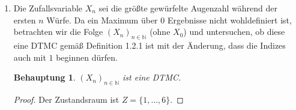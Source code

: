 \documentclass[a4paper]{scrartcl}
\newtheorem*{behaupt}{Behauptung}
\newcommand{\N}{\mathbb{N}}
\newcommand{\prob}{\mathbb{P}}
\begin{document}
\begin{enumerate}[label=\bfseries 1.\arabic*]
\begin{enumerate}[label=\alph*)]
\begin{proof}
                    Die Wahrscheinlichkeit, dass $X_n$ den Zustand $j \in \N_0$
                    annimmt, ist nur von dem Zustand $X_{n-1}$ abhängig ($n \in
                    \N$).  Dabei unterscheiden wir drei Fälle: Wird im $n$-ten
                    Wurf eine Sechs gewürfelt (Wahrscheinlichkeit
                    $\nicefrac{1}{6}$), wird die Anzahl ewürfelter Sechsen
                    inkrementiert ($X_n = X_{n-1}+1$). Bei allen anderen
                    Augenzahlen (Wahrscheinlichkeit $\nicefrac{5}{6}$) bleibt
                    die Anzahl gewürfelter Sechsen unverändert ($X_n =
                    X_{n-1}$).  Weiterhin kann die Anzahl gewürfelter Sechsen
                    nicht verringert oder um mehr als $1$ erhöht werden.
                    Derartige Übergänge sind also ausgeschlossen.
                    Für die Einschritt-Übergangswahrscheinlichkeiten gilt also
                    \begin{equation*}
                        p_{ij} = \prob(X_1=j \ |\  X_0=i) =
                        \begin{cases}
                            \nicefrac{1}{6} & \text{if } j = i + 1 \\
                            \nicefrac{5}{6} & \text{if } j = i \\
                            0 & \text{else}
                        \end{cases}
                        \qquad
                        \forall i,j \in N_0
                        \text{ .}
                    \end{equation*}
                    Da bei $0$ Würfen noch keine Sechs gefallen sein kann, gilt
                    $\prob(X_0 = 0) = 1$.
                    Damit ist $(X_n)_{n \in \N_0}$ eine Markov-Kette.
                \end{proof}

            \item
                Die Zufallsvariable $X_n$ sei die größte gewürfelte Augenzahl
                während der ersten $n$ Würfe.
                Da ein Maximum über $0$ Ergebnisse nicht wohldefiniert ist,
                betrachten wir die Folge $(X_n)_{n \in \N}$ (ohne $X_0$) und
                untersuchen, ob diese eine DTMC gemäß Definition 1.2.1 ist mit
                der Änderung, dass die Indizes auch mit $1$ beginnen dürfen.

                \begin{behaupt}
                    $(X_n)_{n \in \N}$ ist eine DTMC.
                \end{behaupt}
                \begin{proof}
                    Der Zustandsraum ist $Z = \{1, \dotsc, 6\}$.


\end{proof}
\end{enumerate}
\end{enumerate}
\end{document}
